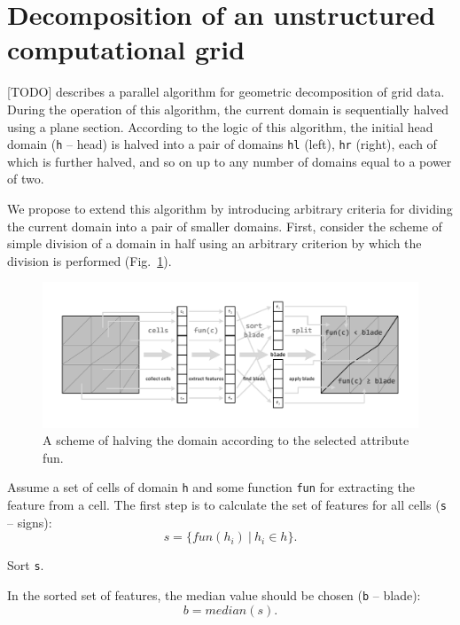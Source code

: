 \documentclass[
11pt,%
tightenlines,%
twoside,%
onecolumn,%
nofloats,%
nobibnotes,%
nofootinbib,%
superscriptaddress,%
noshowpacs,%
centertags]%
{revtex4}
\begin{document}
\section{Decomposition of an unstructured computational grid}

[TODO] describes a parallel algorithm for geometric decomposition of grid data.
During the operation of this algorithm, the current domain is sequentially halved using a plane section.
According to the logic of this algorithm, the initial head domain (\texttt{h} -- head) is halved into a pair of domains \texttt{hl} (left), \texttt{hr} (right), each of which is further halved, and so on up to any number of domains equal to a power of two.

We propose to extend this algorithm by introducing arbitrary criteria for dividing the current domain into a pair of smaller domains.
First, consider the scheme of simple division of a domain in half using an arbitrary criterion by which the division is performed (Fig.~\ref{fig:03-split}).

\begin{figure}[h]
\includegraphics[width=1.0\textwidth]{pics/03-split.pdf}
\caption{A scheme of halving the domain according to the selected attribute fun.}\label{fig:03-split}
\end{figure}

Assume a set of cells of domain \texttt{h} and some function \texttt{fun} for extracting the feature from a cell.
The first step is to calculate the set of features for all cells (\texttt{s} -- signs):
\begin{equation*}
	s = \{fun(h_i)~|~h_i \in h\}.
\end{equation*}

Sort \texttt{s}.

In the sorted set of features, the median value should be chosen (\texttt{b} -- blade):
\begin{equation*}
	b = median(s).
\end{equation*}
\end{document}
